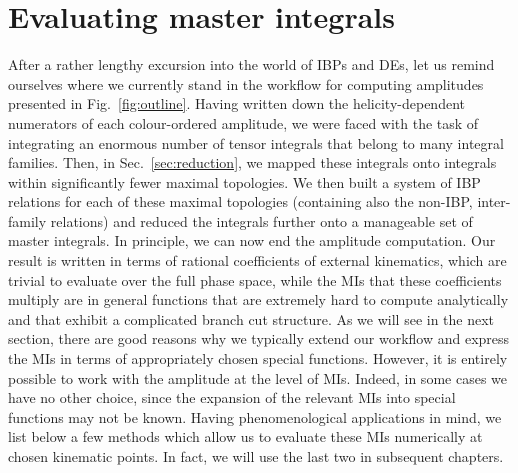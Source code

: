 \documentclass[main.tex]{subfiles}
\begin{document}
\section{Evaluating master integrals}
After a rather lengthy excursion into the world of IBPs and DEs, let us remind ourselves where we currently stand in the workflow for computing amplitudes presented in Fig.~\ref{fig:outline}. Having written down the helicity-dependent numerators of each colour-ordered amplitude, we were faced with the task of integrating an enormous number of tensor integrals that belong to many integral families. Then, in Sec.~\ref{sec:reduction}, we mapped these integrals onto integrals within significantly fewer maximal topologies. We then built a system of IBP relations for each of these maximal topologies (containing also the non-IBP, inter-family relations) and reduced the integrals further onto a manageable set of master integrals. In principle, we can now end the amplitude computation. Our result is written in terms of rational coefficients of external kinematics, which are trivial to evaluate over the full phase space, while the MIs that these coefficients multiply are in general functions that are extremely hard to compute analytically and that exhibit a complicated branch cut structure. As we will see in the next section, there are good reasons why we typically extend our workflow and express the MIs in terms of appropriately chosen special functions. However, it is entirely possible to work with the amplitude at the level of MIs. Indeed, in some cases we have no other choice, since the expansion of the relevant MIs into special functions may not be known. Having phenomenological applications in mind, we list below a few methods which allow us to evaluate these MIs numerically at chosen kinematic points. In fact, we will use the last two in subsequent chapters.
\end{document}
